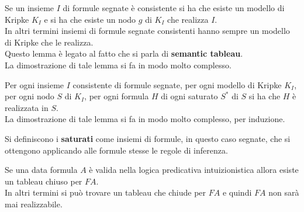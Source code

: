 \documentclass[a4paper,12pt, oneside]{book}
\begin{document}
\begin{lemma}
  Se un insieme $I$ di formule segnate è consistente si ha che esiste un modello
  di Kripke $K_I$ e si ha che esiste un nodo $g$ di $K_I$ che realizza $I$. \\
  In altri termini insiemi di formule segnate consistenti hanno sempre un
  modello di Kripke che le realizza.\\ 
  Questo lemma è legato al fatto che si parla di \textbf{semantic tableau}.\\
  La dimostrazione di tale lemma si fa in modo molto complesso.
\end{lemma}
\begin{lemma}
  Per ogni insieme $I$ consistente di formule segnate, per ogni modello di
  Kripke $K_I$, per ogni nodo $S$ di $K_I$, per ogni formula $H$ di ogni
  saturato $S^*$ di $S$ si ha che $H$ è realizzata in $S$. \\
  La dimostrazione di tale lemma si fa in modo molto complesso, per induzione.
\end{lemma}
\begin{definizione}
  Si definiscono i \textbf{saturati} come insiemi di formule, in questo caso
  segnate, che si ottengono applicando alle formule stesse le regole di
  inferenza. 
\end{definizione}
\begin{teorema}
  Se una data formula $A$ è valida nella logica predicativa intuizionistica
  allora esiste un tableau chiuso per $FA$.\\
  In altri termini si può trovare un tableau che chiude per $FA$ e quindi $FA$
  non sarà mai realizzabile.
\end{teorema}
\end{document}
